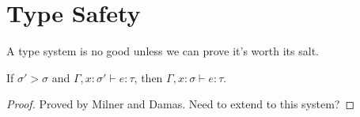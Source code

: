 






\section{Type Safety}

A type system is no good unless we can prove it's worth its salt.

\begin{lemma}
  If $\sigma' > \sigma$ and $\Gamma,x : \sigma' \vdash e : \tau$, then $\Gamma, x : \sigma \vdash e : \tau$.
  \label{lem:generalInContext}
\end{lemma}
\begin{proof}
  Proved by Milner and Damas. Need to extend to this system?
\end{proof}

